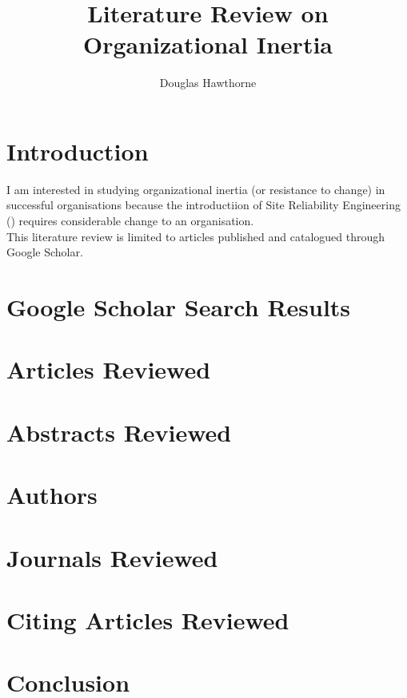 \documentclass[]{report}
\title{Literature Review on Organizational Inertia}
\author{Douglas Hawthorne}
\begin{document}
\maketitle

\begin{abstract}
\end{abstract}

\tableofcontents
\listoftables
\listoffigures

\chapter{Introduction}
I am interested in studying organizational inertia (or resistance to change) in successful organisations because the introductiion of Site Reliability Engineering (\cite{beyer2016site}) requires considerable change to an organisation.\\

This literature review is limited to articles published and catalogued through Google Scholar.\\

\chapter{Google Scholar Search Results}

\chapter{Articles Reviewed}
\chapter{Abstracts Reviewed}

\chapter{Authors}
\chapter{Journals Reviewed}

\chapter{Citing Articles Reviewed}

\chapter{Conclusion}


\end{document}
